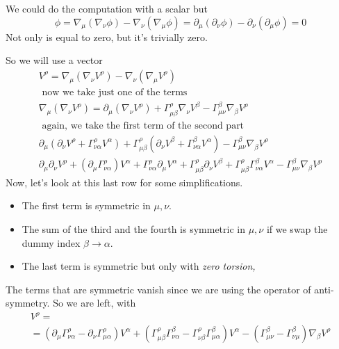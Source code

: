 We could do the computation with a scalar but
\begin{equation}
	[\nabla _{\mu }, \nabla _{\nu }] \phi = \nabla _{\mu}\left( \nabla _{\nu }\phi  \right) -\nabla _{\nu }\left( \nabla _{\mu }\phi  \right) = \partial_{\mu }\left( \partial_{\nu }\phi  \right) - \partial_{\nu }\left( \partial_{\mu }\phi  \right) = 0
\end{equation}
Not only is equal to zero, but it's trivially zero.\par
So we will use a vector
\begin{gather*}
	[\nabla _{\mu },\nabla _{\nu }] V^{\rho } = \nabla _{\mu }\left( \nabla _{\nu }V^{\rho } \right) - \nabla_{\nu }\left( \nabla _{\mu }V^{\rho } \right)	 \\
	\text{ now we take just one of the terms } \\
	\nabla _{\mu }\left( \nabla _{\nu } V^{\rho } \right) = \partial_{\mu } \left( \nabla _{\nu } V^{\rho } \right) + \Gamma ^{\rho }_{\mu \beta } \nabla _{\nu }V^{\beta } - \Gamma ^{\beta }_{\mu \nu } \nabla _{\beta } V^{\rho } \\
	\text{ again, we take the first term of the second part } \\
	\partial_{\mu }\left( \partial_{\nu }V^{\rho } + \Gamma ^{\rho }_{\nu \alpha } V^{\alpha } \right) + \Gamma ^{\rho }_{\mu \beta } \left( \partial_{\nu }V^{\beta } + \Gamma ^{\beta}_{\nu \alpha } V^{\alpha } \right) - \Gamma ^{\beta }_{\mu \nu } \nabla _{\beta }V^{\rho } \\
	\partial_{\mu }\partial_{\nu }V^{\rho } + \left( \partial_{\mu } \Gamma ^{\rho }_{\nu \alpha } \right)V^{\alpha } + \Gamma ^{\rho }_{\nu \alpha } \partial_{\mu }V^{\alpha } + \Gamma ^{\rho }_{\mu \beta } \partial_{\nu }V^{\beta } + \Gamma ^{\rho }_{\mu \beta }\Gamma ^{\beta }_{\nu \alpha } V^{\alpha }- \Gamma ^{\beta }_{\mu \nu }\nabla _{\beta} V^{\rho }
\end{gather*}
Now, let's look at this last row for some simplifications.
\begin{itemize}
\item The first term is symmetric in $\mu , \nu $.
\item The sum of the third and the fourth is symmetric in $\mu , \nu $ if we swap the dummy index $\beta \to \alpha $.
\item The last term is symmetric but only with \emph{zero torsion,}
\end{itemize}
The terms that are symmetric vanish since we are using the operator of anti-symmetry. So we are left, with
\begin{gather}
	[\nabla _{\mu }, \nabla _{\nu }]V^{\rho } =\\
	= \left( \partial_{\mu }\Gamma ^{\rho }_{\nu \alpha } - \partial_{\nu }\Gamma ^{\rho }_{\mu \alpha } \right)V^{\alpha } + \left( \Gamma ^{\rho }_{\mu \beta } \Gamma ^{\beta }_{\nu \alpha } - \Gamma ^{\rho }_{\nu \beta }\Gamma ^{\beta }_{\mu \alpha } \right)V^{\alpha } - \left( \Gamma ^{\beta }_{\mu \nu } - \Gamma ^{\beta }_{\nu \mu } \right)\nabla _{\beta }V^{\rho }
\end{gather}
